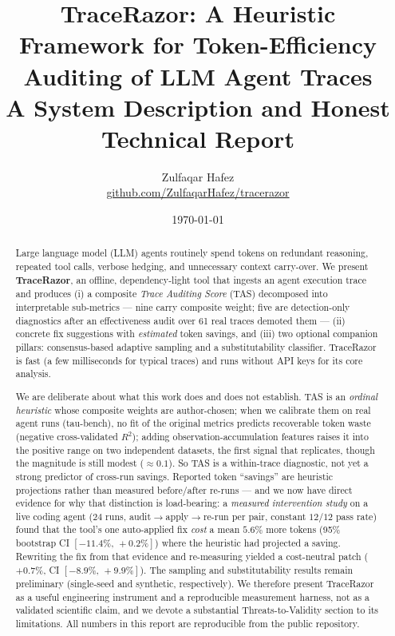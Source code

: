 \documentclass[11pt]{article}
\title{\textbf{TraceRazor: A Heuristic Framework for Token-Efficiency\\
Auditing of LLM Agent Traces}\\[4pt]
\large A System Description and Honest Technical Report}
\author{Zulfaqar Hafez\\
\small\href{https://github.com/ZulfaqarHafez/tracerazor}{github.com/ZulfaqarHafez/tracerazor}}
\date{\today}
\begin{document}
\maketitle

\begin{abstract}
Large language model (LLM) agents routinely spend tokens on redundant
reasoning, repeated tool calls, verbose hedging, and unnecessary context
carry-over. We present \textbf{TraceRazor}, an offline, dependency-light tool
that ingests an agent execution trace and produces (i) a composite
\emph{Trace Auditing Score} (TAS) decomposed into interpretable sub-metrics
--- nine carry composite weight; five are detection-only diagnostics after
an effectiveness audit over 61 real traces demoted them ---
(ii) concrete fix suggestions with \emph{estimated} token savings,
and (iii) two optional companion pillars: consensus-based adaptive sampling
and a substitutability classifier. TraceRazor is fast (a few milliseconds for
typical traces) and runs without API keys for its core analysis.

We are deliberate about what this work does and does not establish. TAS is an
\emph{ordinal heuristic} whose composite weights are author-chosen; when we
calibrate them on real agent runs (tau-bench), no fit of the original metrics
predicts recoverable token waste (negative cross-validated $R^2$); adding
observation-accumulation features raises it into the positive range on two
independent datasets, the first signal that replicates, though the magnitude is
still modest ($\approx 0.1$). So TAS is a within-trace diagnostic, not yet a
strong predictor of cross-run savings. Reported
token ``savings'' are heuristic projections rather than measured before/after
re-runs --- and we now have direct evidence for why that distinction is
load-bearing: a \emph{measured intervention study} on a live coding agent ($24$
runs, audit$\to$apply$\to$re-run per pair, constant $12/12$ pass rate) found
that the tool's one auto-applied fix \emph{cost} a mean $5.6\%$ more tokens
(95\% bootstrap CI $[-11.4\%,\,+0.2\%]$) where the heuristic had projected a
saving. Rewriting the fix from that evidence and re-measuring yielded a
cost-neutral patch ($+0.7\%$, CI $[-8.9\%,\,+9.9\%]$). The sampling and
substitutability results remain preliminary (single-seed and synthetic,
respectively). We therefore present TraceRazor as a useful
engineering instrument and a reproducible measurement harness, not as a
validated scientific claim, and we devote a substantial Threats-to-Validity
section to its limitations. All numbers in this report are reproducible from the
public repository.
\end{abstract}
\end{document}
